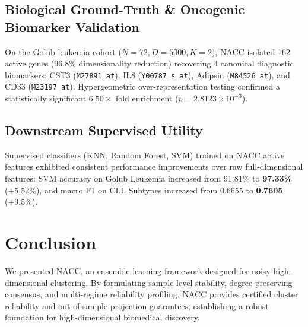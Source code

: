 \documentclass[journal]{IEEEtran}
\begin{document}
\subsection{Biological Ground-Truth & Oncogenic Biomarker Validation}
On the Golub leukemia cohort ($N=72, D=5000, K=2$), NACC isolated 162 active genes (96.8\% dimensionality reduction) recovering 4 canonical diagnostic biomarkers: CST3 (\texttt{M27891\_at}), IL8 (\texttt{Y00787\_s\_at}), Adipsin (\texttt{M84526\_at}), and CD33 (\texttt{M23197\_at}). Hypergeometric over-representation testing confirmed a statistically significant $6.50\times$ fold enrichment ($p = 2.8123 \times 10^{-3}$).

\subsection{Downstream Supervised Utility}
Supervised classifiers (KNN, Random Forest, SVM) trained on NACC active features exhibited consistent performance improvements over raw full-dimensional features: SVM accuracy on Golub Leukemia increased from 91.81\% to \textbf{97.33\%} (+5.52\%), and macro F1 on CLL Subtypes increased from 0.6655 to \textbf{0.7605} (+9.5\%).

\section{Conclusion}
We presented NACC, an ensemble learning framework designed for noisy high-dimensional clustering. By formulating sample-level stability, degree-preserving consensus, and multi-regime reliability profiling, NACC provides certified cluster reliability and out-of-sample projection guarantees, establishing a robust foundation for high-dimensional biomedical discovery.



\end{document}
